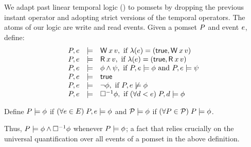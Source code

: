 We adapt past linear temporal logic (\pLTL)
\cite{Lichtenstein:1985:GP:648065.747612} to pomsets by dropping the previous
instant operator and adopting strict versions of the temporal operators.
The atoms of our logic are write and read events.
  Given a pomset $P$ and event $e$, define:
  \begin{displaymath}
    \begin{array}{lrl}
      \aPS,\aEv &\models& \DW{\aLoc}{\aVal}, \text{ if } \labeling(\aEv) =  (\TRUE, \DW{\aLoc}{\aVal}) \\
      \aPS,\aEv &\models& \DR{\aLoc}{\aVal}, \text{ if } \labeling(\aEv) =  (\TRUE, \DR{\aLoc}{\aVal}) \\
      \aPS,\aEv &\models& \afo\land\bfo, \text{ if } \aPS,\aEv \models  \afo \text{ and } \aPS,\aEv \models  \bfo \\
      \aPS,\aEv &\models& \TRUE\\
      \aPS,\aEv &\models& \lnot\afo, \text{ if } \aPS,\aEv \not\models \afo \\
      \aPS,\aEv &\models& \always\afo, \text{ if } (\forall \bEv \lt \aEv)\; \aPS,\bEv \models \afo
    \end{array} 
  \end{displaymath}

\begin{definition}
  Define $P \models \phi$ if
  $(\forall e \in E) \;P,e \models\phi$ and $\mathcal{P}\models \phi$
  if $(\forall P \in \mathcal{P})\; P \models\phi$.
\end{definition}
Thus, $P\models \phi \land \Box^{-1}\phi$ whenever $P \models \phi$; a fact that relies crucially on the universal quantification over all events of a pomset in the above definition.

